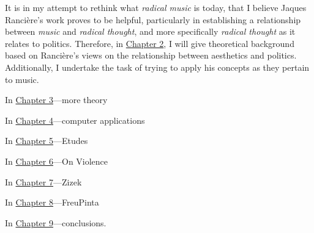 


It is in my attempt to rethink what \emph{radical music} is today, that I believe Jaques Ranci\`{e}re's work proves to be helpful, particularly in establishing a relationship between \emph{music} and \emph{radical thought}, and more specifically \emph{radical thought} as it relates to politics. Therefore, in \hyperlink{chapter2}{Chapter 2}, I will give theoretical background based on Ranci\`{e}re's views on the relationship between aesthetics and politics. Additionally, I undertake the task of trying to apply his concepts as they pertain to music. 

In \hyperlink{chapter3}{Chapter 3}---more theory

In \hyperlink{chapter4}{Chapter 4}---computer applications

In \hyperlink{chapter5}{Chapter 5}---Etudes

In \hyperlink{chapter6}{Chapter 6}---On Violence

In \hyperlink{chapter7}{Chapter 7}---Zizek

In \hyperlink{chapter8}{Chapter 8}---FreuPinta

In \hyperlink{chapter9}{Chapter 9}---conclusions.

\label{ch:intro}
